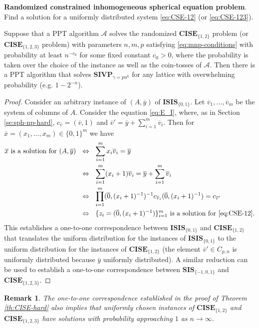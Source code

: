 \documentclass{jgcc}
\newtheorem{remark}{Remark}
\def\ovo{{\overline{0}}}
\def\ovv{{\overline{v}}}
\def\ovx{{\overline{x}}}
\def\ovy{{\overline{y}}}
\def\CA{{\mathcal A}}
\def\SIS{{\mathbf{SIS}}}
\def\ISIS{{\mathbf{ISIS}}}
\def\SIVP{{\mathbf{SIVP}}}
\def\CISE{{\mathbf{CISE}}}
\begin{document}
\medskip\noindent
\textbf{Randomized constrained inhomogeneous spherical equation problem}.
Find a solution for a uniformly distributed system \eqref{eq:CSE-12}
(or \eqref{eq:CSE-123}).

\medskip
\begin{thm}\label{th:CISE-hard}
Suppose that a PPT algorithm $\CA$ solves
the randomized $\CISE_{\{1,2\}}$ problem 
(or $\CISE_{\{1,2,3\}}$ problem)
with parameters $n,m,p$ satisfying \eqref{eq:mnp-conditions}
with probability at least $n^{-c_0}$ for some fixed constant $c_0>0$,
where the probability is taken over the choice of 
the instance as well as the coin-tosses of $\CA$.
Then there is a PPT algorithm
that solves $\SIVP_{\gamma=pn^6}$ for any lattice
with overwhelming probability (e.g. $1-2^{-n}$).
\end{thm}

\begin{proof}
Consider an arbitrary instance of $(A,\ovy)$ of $\ISIS_{\{0,1\}}$.
Let $\ovv_1,\dots,\ovv_m$ be the system of columns of $A$. 
Consider the equation \eqref{eq:E_I},
where, as in Section \ref{se:sph-np-hard}, 
$c_\ovv=(\ovv,1)$ and $\ovv'=\ovy + \sum_{i=1}^m \ovv_i$.
Then for $\ovx=(x_1,\dots,x_m)\in\{0,1\}^m$ we have
\begin{align*}
\ovx
\mbox{ is a solution for $(A,\ovy)$}
&\ \ \Leftrightarrow\ \ 
\sum_{i=1}^m x_i \ovv_i =  \ovy\\
&\ \ \Leftrightarrow\ \ 
\sum_{i=1}^m (x_i+1)\ovv_i =  \ovy + \sum_{i=1}^m \ovv_i\\
&\ \ \Leftrightarrow\ \ 
\prod_{i=1}^m (\ovo,(x_i+1)^{-1})^{-1} c_{\ovv_i} (\ovo,(x_i+1)^{-1}) 
= c_{\ovv'}\\
&\ \ \Leftrightarrow\ \ 
\{z_i=(\ovo,(x_i+1)^{-1})\}_{i=1}^m
\mbox{ is a solution for \eqref{eq:CSE-12}.}
\end{align*}
This establishes a one-to-one correspondence between 
$\ISIS_{\{0,1\}}$ and $\CISE_{\{1,2\}}$ that
translates the uniform distribution for the instances of $\ISIS_{\{0,1\}}$
to the uniform distribution for the instances of $\CISE_{\{1,2\}}$
(the element $\ovv'\in C_{p,n}$ is uniformly distributed because $\ovy$
uniformly distributed).
A similar reduction can be used to establish
a one-to-one correspondence between 
$\SIS_{\{-1,0,1\}}$ and $\CISE_{\{1,2,3\}}$. 
\end{proof}

\begin{remark}
The one-to-one correspondence established in the proof of Theorem \ref{th:CISE-hard}
also implies that uniformly chosen instances of 
$\CISE_{\{1,2\}}$ and $\CISE_{\{1,2,3\}}$
have solutions with probability approaching $1$ as $n\to\infty$.
\end{remark}
\end{document}
